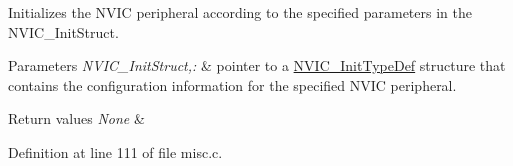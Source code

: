 Initializes the N\-V\-I\-C peripheral according to the specified parameters in the N\-V\-I\-C\-\_\-\-Init\-Struct. 


\begin{DoxyParams}{Parameters}
{\em N\-V\-I\-C\-\_\-\-Init\-Struct,\-:} & pointer to a \hyperlink{struct_n_v_i_c___init_type_def}{N\-V\-I\-C\-\_\-\-Init\-Type\-Def} structure that contains the configuration information for the specified N\-V\-I\-C peripheral. \\
\hline
\end{DoxyParams}

\begin{DoxyRetVals}{Return values}
{\em None} & \\
\hline
\end{DoxyRetVals}


Definition at line 111 of file misc.\-c.

